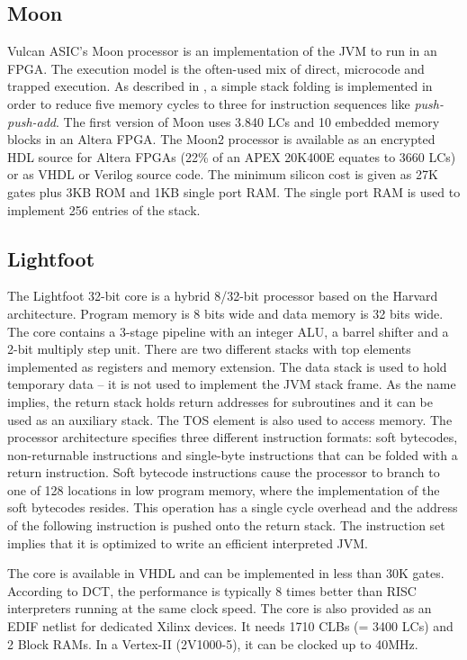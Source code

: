 \subsection{Moon}

Vulcan ASIC's Moon processor is an implementation of the JVM to run
in an FPGA. The execution model is the often-used mix of direct,
microcode and trapped execution. As described in \cite{Vulcan2000},
a simple stack folding is implemented in order to reduce five memory
cycles to three for instruction sequences like
\textit{push-push-add}. The first version of Moon uses 3.840 LCs and
10 embedded memory blocks in an Altera FPGA. The Moon2 processor
\cite{Vulcan2003} is available as an encrypted HDL source for Altera
FPGAs (22\% of an APEX 20K400E equates to 3660 LCs) or as VHDL or
Verilog source code. The minimum silicon cost is given as 27K gates
plus 3KB ROM and 1KB single port RAM. The single port RAM is used to
implement 256 entries of the stack.


\subsection{Lightfoot}

The Lightfoot 32-bit core \cite{Lightfoot} is a hybrid 8/32-bit
processor based on the Harvard architecture. Program memory is 8
bits wide and data memory is 32 bits wide. The core contains a
3-stage pipeline with an integer ALU, a barrel shifter and a 2-bit
multiply step unit. There are two different stacks with top elements
implemented as registers and memory extension. The data stack is
used to hold temporary data -- it is not used to implement the JVM
stack frame. As the name implies, the return stack holds return
addresses for subroutines and it can be used as an auxiliary stack.
The TOS element is also used to access memory. The processor
architecture specifies three different instruction formats: soft
bytecodes, non-returnable instructions and single-byte instructions
that can be folded with a return instruction. Soft bytecode
instructions cause the processor to branch to one of 128 locations
in low program memory, where the implementation of the soft
bytecodes resides. This operation has a single cycle overhead and
the address of the following instruction is pushed onto the return
stack. The instruction set implies that it is optimized to write an
efficient interpreted JVM.


The core is available in VHDL and can be implemented in less than
30K gates. According to DCT, the performance is typically 8 times
better than RISC interpreters running at the same clock speed. The
core is also provided as an EDIF netlist for dedicated Xilinx
devices. It needs 1710 CLBs (= 3400 LCs) and 2 Block RAMs. In a
Vertex-II (2V1000-5), it can be clocked up to 40MHz.


